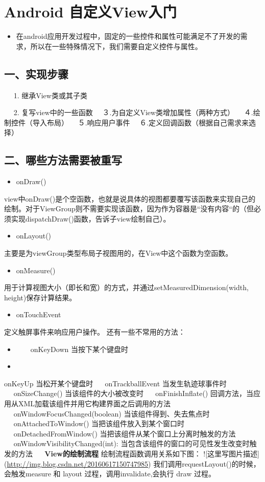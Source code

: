 \documentclass[9pt, b5paper]{article}
\begin{document}
\section{Android 自定义View入门}
\label{sec-10}
\begin{itemize}
\item 在android应用开发过程中，固定的一些控件和属性可能满足不了开发的需求，所以在一些特殊情况下，我们需要自定义控件与属性。
\end{itemize}
\subsection{一、实现步骤}
\label{sec-10-1}
　 1. 继承View类或其子类　

　 2. 复写view中的一些函数
 　３.为自定义View类增加属性（两种方式）
　４.绘制控件（导入布局）
　５.响应用户事件
　６.定义回调函数（根据自己需求来选择）
\subsection{二、哪些方法需要被重写}
\label{sec-10-2}
\begin{itemize}
\item onDraw()
\end{itemize}
view中onDraw()是个空函数，也就是说具体的视图都要覆写该函数来实现自己的绘制。对于ViewGroup则不需要实现该函数，因为作为容器是“没有内容“的（但必须实现dispatchDraw()函数，告诉子view绘制自己）。
\begin{itemize}
\item onLayout()
\end{itemize}
主要是为viewGroup类型布局子视图用的，在View中这个函数为空函数。
\begin{itemize}
\item onMeasure()
\end{itemize}
用于计算视图大小（即长和宽）的方式，并通过setMeasuredDimension(width, height)保存计算结果。
\begin{itemize}
\item onTouchEvent
\end{itemize}
定义触屏事件来响应用户操作。
还有一些不常用的方法：
\begin{itemize}
\item 　　onKeyDown 当按下某个键盘时 　
\item 
\end{itemize}
onKeyUp 当松开某个键盘时 　
onTrackballEvent 当发生轨迹球事件时 　
onSizeChange() 当该组件的大小被改变时 　
onFinishInflate() 回调方法，当应用从XML加载该组件并用它构建界面之后调用的方法 　
onWindowFocusChanged(boolean) 当该组件得到、失去焦点时 　
onAttachedToWindow() 当把该组件放入到某个窗口时 　
onDetachedFromWindow() 当把该组件从某个窗口上分离时触发的方法 　
onWindowVisibilityChanged(int): 当包含该组件的窗口的可见性发生改变时触发的方法 　
\textbf{\textbf{View的绘制流程}}
绘制流程函数调用关系如下图：
![这里写图片描述](\url{http://img.blog.csdn.net/20160617150747985}) 
我们调用requestLayout()的时候，会触发measure 和 layout 过程，调用invalidate,会执行 draw 过程。
\end{document}
